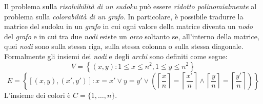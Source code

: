 \noindent
Il problema sulla \emph{risolvibilità di un sudoku} può essere \emph{ridotto
polinomialmente} al problema sulla \emph{colorabilità di un grafo}. In
particolare, è possibile tradurre la matrice del sudoku in un \emph{grafo} in
cui ogni valore della matrice diventa un \emph{nodo} del \emph{grafo} e in cui
tra due \emph{nodi} esiste un \emph{arco} soltanto se, all'interno della matrice,
quei \emph{nodi} sono sulla stessa riga, sulla stessa colonna o sulla stessa
diagonale. Formalmente gli insiemi dei \emph{nodi} e degli \emph{archi} sono
definiti come segue:
\[V=\left\{(x,y):1\leq x\leq n^2, 1\leq y\leq n^2\right\}\]
\[E=\left\{[(x,y),(x',y')]: x=x' \vee y=y' \vee \left(
    \left\lceil\frac{x}{n}\right\rceil =
    \left\lceil\frac{x'}{n}\right\rceil \wedge
    \left\lceil\frac{y}{n}\right\rceil = \left\lceil\frac{y'}{n}\right\rceil
\right)\right\}\]
L'insieme dei colori è $C=\{1,\dots,n\}$.

